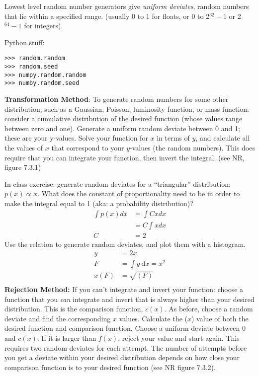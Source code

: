 \documentclass{article}
\begin{document}
Lowest level random number generators give \emph{uniform deviates},
random numbers that lie within a specified range.
(usually 0 to 1 for floats, or 0 to 2$^{32}-1$ or 2$^{64}-1$ for integers).

Python stuff:
\begin{verbatim}
>>> random.random
>>> random.seed
>>> numpy.random.random
>>> numby.random.seed
\end{verbatim}

{\bf Transformation Method}:
To generate random numbers for some other distribution, such as a
Gaussian, Poisson, luminosity function, or mass function:
consider a cumulative distribution of the desired function (whose values range
between zero and one). Generate a uniform random deviate between 0 and 1; these
are your y-values. Solve your function for $x$ in terms of $y$, and calculate
all the values of $x$ that correspond to your $y$-values (the random numbers).
This does require that you can integrate your function, then invert
the integral.  (see NR, figure 7.3.1)

In-class exercise: generate random deviates for a ``triangular'' distribution:
$p(x) \propto x$. What does the constant of proportionality need to be in order
to make the integral equal to 1 (aka: a probability distribution)?
\begin{align*}
    \int{p(x) dx} &= \int{Cx dx}\\
    &= C\int{x dx}\\
    C &= 2
\end{align*}
Use the
relation to generate random deviates, and plot them with a histogram.
\begin{align*}
    y &= 2x \\
    F &= \int \! y \ \mathrm{d}x = x^2\\
    x(F) &= \sqrt{(F)} \\
\end{align*}
{\bf Rejection Method:}
If you can't integrate and invert your function:
choose a function that you \emph{can} integrate and invert
that is always higher than your desired distribution.
This is the comparison function, $c(x)$. As before, choose a random deviate
and find the corresponding $x$ values. Calculate the ($x$) value of both
the desired function and comparison function. Choose a uniform deviate between
0 and $c(x)$. If it is larger than $f(x)$, reject your value and start again.
This requires two random deviates for each attempt.
The number of attempts
before you get a deviate within your desired distribution depends on how
close your
comparison function is to your desired function (see NR figure 7.3.2).
\end{document}

